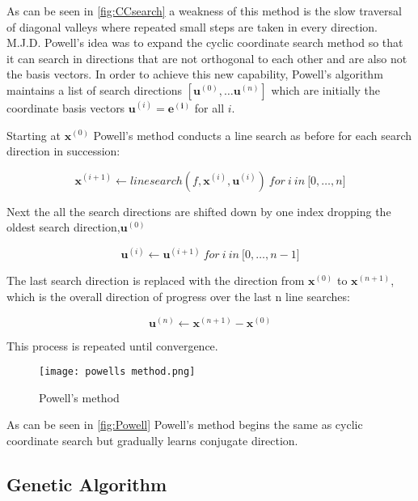 As can be seen in \autoref{fig:CCsearch} a weakness of this method is the slow
traversal of diagonal valleys where repeated small steps are taken in
every direction. M.J.D. Powell's idea was to expand the cyclic
coordinate search method so that it can search in directions that are
not orthogonal to each other and are also not the basis vectors. In
order to achieve this new capability, Powell's algorithm maintains a list
of search directions
$\left\lbrack \mathbf{u}^{(0)},\ldots\mathbf{u}^{(n)} \right\rbrack$
which are initially the coordinate basis vectors
$\mathbf{u}^{(i)}=\mathbf{e}^{\left( \mathbf{i} \right)}$ for
all $i$.

Starting at $\mathbf{x}^{(0)}$ Powell's method conducts a line search
as before for each search direction in succession:


\begin{equation}
\mathbf{x}^{(i + 1)} \leftarrow linesearch\left( f,\mathbf{x}^{(i)}\mathbf{,}\mathbf{u}^{(i)} \right)\mathbf{\ }for\ i\ in\ \lbrack 0,\ldots,n\rbrack
\end{equation}

Next the all the search directions are shifted down by one index
dropping the oldest search direction,$\mathbf{u}^{(0)}\ $

\begin{equation}
\mathbf{u}^{(i)} \leftarrow \mathbf{u}^{(i + 1)}\ for\ i\ in\ \lbrack 0,\ldots,n - 1\rbrack
\end{equation}

The last search direction is replaced with the direction from
$\mathbf{x}^{(0)}$ to $\mathbf{x}^{(n + 1)}$, which is the overall
direction of progress over the last n line searches:

\begin{equation}
\mathbf{u}^{(n)} \leftarrow \mathbf{x}^{(n + 1)} - \mathbf{x}^{(0)}
\end{equation}

This process is repeated until convergence.
\begin{figure}[H]
    \centering
    \texttt{[image: powells method.png]}
    \caption{Powell's method \cite{kochenderfer2019}}
    \label{fig:Powell}

\end{figure}

As can be seen in \autoref{fig:Powell} Powell's method begins the same as cyclic
coordinate search but gradually learns conjugate direction.


\subsection{Genetic Algorithm}
\label{genetic-algorithm}

